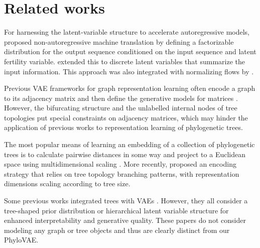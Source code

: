 \section{Related works}
For harnessing the latent-variable structure to accelerate autoregressive models, \citet{gu2018nonar} proposed non-autoregressive machine translation by defining a factorizable distribution for the output sequence conditioned on the input sequence and latent fertility variable. 
\citet{kaiser2018fast} extended this to discrete latent variables that summarize the input information.
This approach was also integrated with normalizing flows by \citet{ma2019flowseq}.

Previous VAE frameworks for graph representation learning often encode a graph to its adjacency matrix and then define the generative models for matrices \citep{kipf2016VGAE, GraphVAE, winter2021permutation, zahirnia2022micro}.
However, the bifurcating structure and the unlabelled internal nodes of tree topologies put special constraints on adjacency matrices, which may hinder the application of previous works to representation learning of phylogenetic trees.

The most popular means of learning an embedding of a collection of phylogenetic trees is to calculate pairwise distances in some way and project to a Euclidean space using multidimensional scaling \citep{amenta2002,hillis2005analysis,Jombart2017-qw}.
More recently, \citet{penn2023phylo2vec} proposed an encoding strategy that relies on tree topology branching patterns, with representation dimensions scaling according to tree size.

{ Some previous works integrated trees with VAEs \citep{shin2017treestructured, Vikram2018loracs, manduchi2023treevae}. However, they all consider a tree-shaped prior distribution or hierarchical latent variable structure for enhanced interpretability and generative quality. These papers do not consider modeling any graph or tree objects and thus are clearly distinct from our PhyloVAE.}